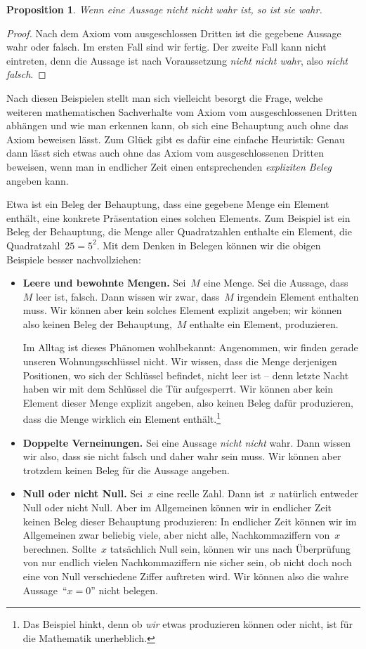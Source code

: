 \documentclass[twoside]{../zirkelblatt}
\theoremstyle{definition}
\theoremstyle{plain}
\newtheorem{prop}[defn]{Proposition}
\theoremstyle{remark}
\begin{document}
\begin{prop}Wenn eine Aussage \emph{nicht nicht} wahr ist, so ist sie wahr.
\end{prop}
\begin{proof}Nach dem Axiom vom ausgeschlossen Dritten ist die gegebene Aussage wahr
oder falsch. Im ersten Fall sind wir fertig. Der zweite Fall kann nicht
eintreten, denn die Aussage ist nach Voraussetzung \emph{nicht nicht wahr}, also \emph{nicht
falsch}.
\end{proof}

Nach diesen Beispielen stellt man sich vielleicht besorgt die Frage, welche
weiteren mathematischen Sachverhalte vom Axiom vom ausgeschlossenen Dritten
abhängen und wie man erkennen kann, ob sich eine Behauptung auch ohne das Axiom
beweisen lässt. Zum Glück gibt es dafür eine einfache Heuristik: Genau dann
lässt sich etwas auch ohne das Axiom vom ausgeschlossenen Dritten beweisen,
wenn man in endlicher Zeit einen entsprechenden \emph{expliziten Beleg} angeben
kann.

Etwa ist ein Beleg der Behauptung, dass eine gegebene Menge ein Element
enthält, eine konkrete Präsentation eines solchen Elements. Zum Beispiel ist ein Beleg der
Behauptung, die Menge aller Quadratzahlen enthalte ein Element, die
Quadratzahl~$25 = 5^2$. Mit dem Denken in Belegen können wir die obigen
Beispiele besser nachvollziehen:

\begin{itemize}
\item \textbf{Leere und bewohnte Mengen.} Sei~$M$ eine Menge. Sei die Aussage,
dass~$M$ leer ist, falsch. Dann wissen wir zwar, dass~$M$ irgendein Element
enthalten muss. Wir können aber kein solches Element explizit angeben; wir
können also keinen Beleg der Behauptung,~$M$ enthalte ein Element, produzieren.

Im Alltag ist dieses Phänomen wohlbekannt: Angenommen, wir finden gerade unseren
Wohnungsschlüssel nicht. Wir wissen, dass die Menge derjenigen Positionen, wo
sich der Schlüssel befindet, nicht leer ist -- denn letzte Nacht haben wir mit
dem Schlüssel die Tür aufgesperrt. Wir können aber kein Element dieser Menge
explizit angeben, also keinen Beleg dafür produzieren, dass die Menge wirklich
ein Element enthält.\footnote{Das Beispiel hinkt, denn ob \emph{wir} etwas
produzieren können oder nicht, ist für die Mathematik unerheblich.}
\item \textbf{Doppelte Verneinungen.} Sei eine Aussage \emph{nicht nicht} wahr.
Dann wissen wir also, dass sie nicht falsch und daher wahr sein muss. Wir
können aber trotzdem keinen Beleg für die Aussage angeben.
\item \textbf{Null oder nicht Null.} Sei~$x$ eine reelle Zahl. Dann ist~$x$
natürlich entweder Null oder nicht Null. Aber im Allgemeinen können wir in
endlicher Zeit keinen Beleg dieser Behauptung produzieren: In endlicher Zeit
können wir im Allgemeinen zwar beliebig viele, aber nicht alle,
Nachkommaziffern von~$x$ berechnen. Sollte~$x$ tatsächlich Null sein, können
wir uns nach Überprüfung von nur endlich vielen Nachkommaziffern nie sicher
sein, ob nicht doch noch eine von Null verschiedene Ziffer auftreten wird. Wir können
also die wahre Aussage~"`$x = 0$"' nicht belegen.
\end{itemize}
\end{document}

